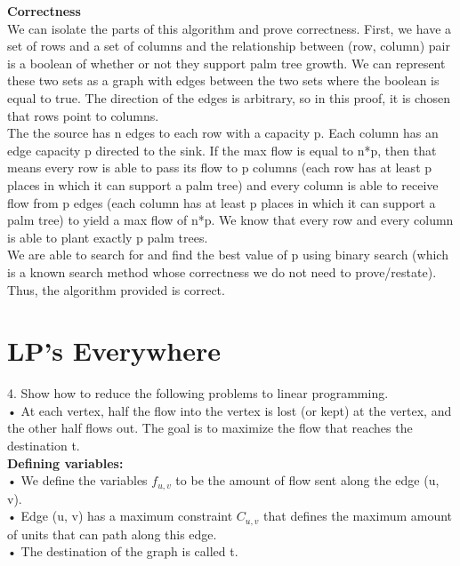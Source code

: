 \documentclass[11pt, solution, letterpaper]{format}
\begin{document}
\textbf{Correctness}\\
We can isolate the parts of this algorithm and prove correctness. First, we have a set of rows and a set of columns and the relationship between (row, column) pair is a boolean of whether or not they support palm tree growth. We can represent these two sets as a graph with edges between the two sets where the boolean is equal to true. The direction of the edges is arbitrary, so in this proof, it is chosen that rows point to columns. \\

The the source has n edges to each row with a capacity p. Each column has an edge capacity p directed to the sink. If the max flow is equal to n*p, then that means every row is able to pass its flow to p columns (each row has at least p places in which it can support a palm tree) and every column is able to receive flow from p edges (each column has at least p places in which it can support a palm tree) to yield a max flow of n*p. We know that every row and every column is able to plant exactly p palm trees.\\

We are able to search for and find the best value of p using binary search (which is a known search method whose correctness we do not need to prove/restate).\\

Thus, the algorithm provided is correct.\\

\clearpage
\section{LP's Everywhere}
4. Show how to reduce the following problems to linear programming.\\
• At each vertex, half the flow into the vertex is lost (or kept) at the vertex, and the other half flows out.
The goal is to maximize the flow that reaches the destination t.\\

\textbf{Defining variables:}\\
• We define the variables $f_{u, v}$ to be the amount of flow sent along the edge (u, v).\\  
• Edge (u, v)  has a maximum constraint $C_{u, v}$ that defines the maximum amount of units that can path along this edge. \\
• The destination of the graph is called t.\\
\end{document}
